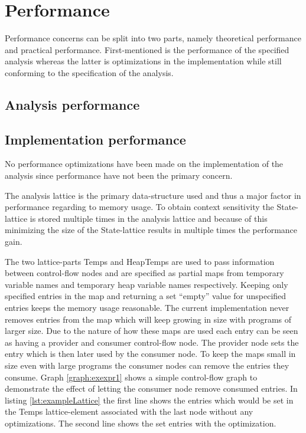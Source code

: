 \section{Performance}
Performance concerns can be split into two parts, namely theoretical performance and practical performance. First-mentioned is the performance of the specified analysis whereas the latter is optimizations in the implementation while still conforming to the specification of the analysis.


\subsection{Analysis performance}

\subsection{Implementation performance}
No performance optimizations have been made on the implementation of the analysis since performance have not been the primary concern.

The analysis lattice is the primary data-structure used and thus a major factor in performance regarding to memory usage. To obtain context sensitivity the State-lattice is stored multiple times in the analysis lattice and because of this minimizing the size of the State-lattice results in multiple times the performance gain.

The two lattice-parts Temps and HeapTemps are used to pass information between control-flow nodes and are specified as partial maps from temporary variable names and temporary heap variable names respectively. Keeping only specified entries in the map and returning a set ``empty'' value for unspecified entries keeps the memory usage reasonable. The current implementation never removes entries from the map which will keep growing in size with programs of larger size. Due to the nature of how these maps are used each entry can be seen as having a provider and consumer control-flow node. The provider node sets the entry which is then later used by the consumer node. To keep the maps small in size even with large programs the consumer nodes can remove the entries they consume. Graph \ref{graph:exexpr1} shows a simple control-flow graph to demonstrate the effect of letting the consumer node remove consumed entries. In listing \ref{lst:exampleLattice} the first line shows the entries which would be set in the Temps lattice-element associated with the last node without any optimizations. The second line shows the set entries with the optimization.

